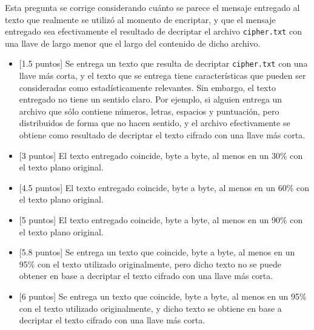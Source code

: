 Esta pregunta se corrige considerando cuánto se parece el mensaje entregado al texto que realmente se utilizó al momento de encriptar, y que el mensaje entregado sea efectivamente el resultado de decriptar el archivo \texttt{cipher.txt} con una llave de largo menor que el largo del contenido de dicho archivo.
\begin{itemize}
    \item{[1.5 puntos]} Se entrega un texto que resulta de decriptar \texttt{cipher.txt} con una llave más corta, y el texto que se entrega tiene características que pueden ser consideradas como estadísticamente relevantes. Sin embargo, el texto entregado no tiene un sentido claro. Por ejemplo, si alguien entrega un archivo que sólo contiene números, letras, espacios y puntuación, pero distribuidos de forma que no hacen sentido, y el archivo efectivamente se obtiene como resultado de decriptar el texto cifrado con una llave más corta.

    \item{[3 puntos]} El texto entregado coincide, byte a byte, al menos en un 30\% con el texto plano original.

    \item{[4.5 puntos]} El texto entregado coincide, byte a byte, al menos en un 60\% con el texto plano original.

    \item{[5 puntos]} El texto entregado coincide, byte a byte, al menos en un 90\% con el texto plano original.

    \item{[5.8 puntos]} Se entrega un texto que coincide, byte a byte, al menos en un 95\% con el texto utilizado originalmente, pero dicho texto no se puede obtener en base a decriptar el texto cifrado con una llave más corta.

    \item{[6 puntos]} Se entrega un texto que coincide, byte a byte, al menos en un 95\% con el texto utilizado originalmente, y dicho texto se obtiene en base a decriptar el texto cifrado con una llave más corta.
\end{itemize}


\medskip
